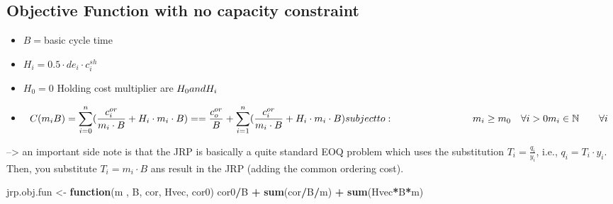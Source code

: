 \documentclass[
]{article}
\newenvironment{Shaded}{\begin{snugshade}}{\end{snugshade}}
\newcommand{\CommentTok}[1]{\textcolor[rgb]{0.56,0.35,0.01}{\textit{#1}}}
\newcommand{\ControlFlowTok}[1]{\textcolor[rgb]{0.13,0.29,0.53}{\textbf{#1}}}
\newcommand{\DataTypeTok}[1]{\textcolor[rgb]{0.13,0.29,0.53}{#1}}
\newcommand{\FloatTok}[1]{\textcolor[rgb]{0.00,0.00,0.81}{#1}}
\newcommand{\KeywordTok}[1]{\textcolor[rgb]{0.13,0.29,0.53}{\textbf{#1}}}
\newcommand{\NormalTok}[1]{#1}
\newcommand{\OperatorTok}[1]{\textcolor[rgb]{0.81,0.36,0.00}{\textbf{#1}}}
\newcommand{\StringTok}[1]{\textcolor[rgb]{0.31,0.60,0.02}{#1}}
\providecommand{\tightlist}{%
  \setlength{\itemsep}{0pt}\setlength{\parskip}{0pt}}
\begin{document}
\begin{Shaded}
\end{Shaded}

\hypertarget{objective-function-with-no-capacity-constraint}{%
\subsection{Objective Function with no capacity
constraint}\label{objective-function-with-no-capacity-constraint}}

\begin{itemize}
\tightlist
\item
  \(B=\)basic cycle time
\item
  \(H_i=0.5 \cdot de_i \cdot c_i^{sh}\)
\item
  \(H_0=0\) Holding cost multiplier are \(H_0 \space and \space H_i\)
\item
  \[C(m_i B)=\sum_{i=0}^n (\frac {c_i^{or}}{m_i \cdot B}+H_i \cdot m_i \cdot B) == \frac {c_o^{or}}{B}+ \sum_{i=1}^n (\frac {c_i^{or}}{m_i \cdot B}+H_i \cdot m_i \cdot B)  \\ subject \space to: \quad \quad \quad \quad \quad \quad \quad \quad \quad  \\ m_i \ge m_0 \quad \forall i >0 \\m_i \in \mathbb N \qquad \forall i   \]
\end{itemize}

--\textgreater{} an important side note is that the JRP is basically a
quite standard EOQ problem which uses the substitution
\(T_i = \frac{q_i}{y_i}\), i.e., \(q_i = T_i \cdot y_i\). Then, you
substitute \(T_i = m_i \cdot B\) ans result in the JRP (adding the
common ordering cost).

\begin{Shaded}
\begin{Highlighting}[]
\NormalTok{jrp.obj.fun <-}\StringTok{ }\ControlFlowTok{function}\NormalTok{(m , B, cor, Hvec, cor0) cor0}\OperatorTok{/}\NormalTok{B }\OperatorTok{+}\StringTok{ }\KeywordTok{sum}\NormalTok{(cor}\OperatorTok{/}\NormalTok{B}\OperatorTok{/}\NormalTok{m) }\OperatorTok{+}\StringTok{ }\KeywordTok{sum}\NormalTok{(Hvec}\OperatorTok{*}\NormalTok{B}\OperatorTok{*}\NormalTok{m)}
\end{Highlighting}
\end{Shaded}
\end{document}
